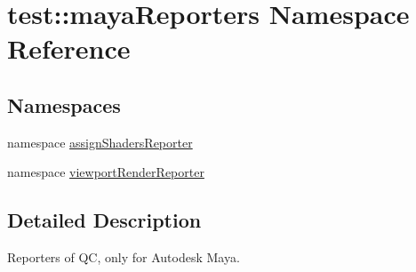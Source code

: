 \hypertarget{namespacetest_1_1mayaReporters}{\section{test\-:\-:maya\-Reporters \-Namespace \-Reference}
\label{da/d4a/namespacetest_1_1mayaReporters}
}
\subsection*{\-Namespaces}
\begin{DoxyCompactItemize}
\item 
namespace \hyperlink{namespacetest_1_1mayaReporters_1_1assignShadersReporter}{assign\-Shaders\-Reporter}
\item 
namespace \hyperlink{namespacetest_1_1mayaReporters_1_1viewportRenderReporter}{viewport\-Render\-Reporter}
\end{DoxyCompactItemize}


\subsection{\-Detailed \-Description}
\begin{DoxyVerb}
Reporters of QC, only for Autodesk Maya.
\end{DoxyVerb}
 